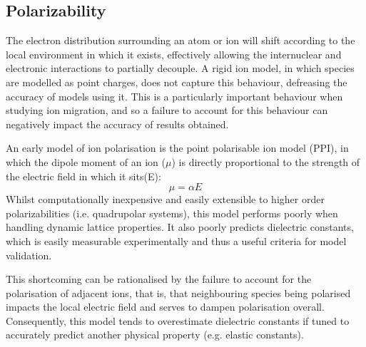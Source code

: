 \subsection{Polarizability}
The electron distribution surrounding an atom or ion will shift according to the local environment in which it exists, effectively allowing the internuclear and electronic interactions to partially decouple.
A rigid ion model, in which species are modelled as point charges, does not capture this behaviour, defreasing the accuracy of models using it.
This is a particularly important behaviour when studying ion migration, and so a failure to account for this behaviour can negatively impact the accuracy of results obtained.

An early model of ion polarisation is the point polarisable ion model (PPI), in which the dipole moment of an ion ($\mu$) is directly proportional to the strength of the electric field in which it sits(E):
\begin{equation}
\mu = \alpha E
\end{equation}
Whilst computationally inexpensive and easily extensible to higher order polarizabilities (i.e. quadrupolar systems), this model performs poorly when handling dynamic lattice properties.
It also poorly predicts dielectric constants, which is easily measurable experimentally and thus a useful criteria for model validation.

This shortcoming can be rationalised by the failure to account for the polarisation of adjacent ions, that is, that neighbouring species being polarised impacts the local electric field and serves to dampen polarisation overall.
Consequently, this model tends to overestimate dielectric constants if tuned to accurately predict another physical property (e.g. elastic constants).


